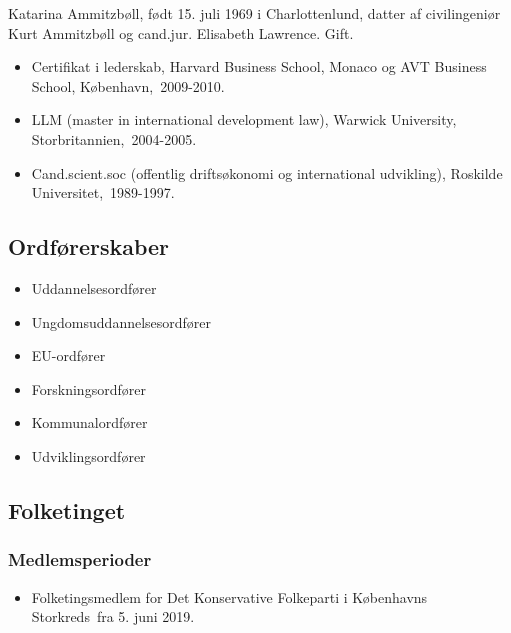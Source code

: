 \documentclass[11pt, a4paper]{awesome-cv}
\begin{document}
\makecvheader[R]
\makelettertitle
\begin{cvletter}
Katarina Ammitzbøll, født 15. juli 1969 i Charlottenlund, datter af civilingeniør Kurt Ammitzbøll og cand.jur. Elisabeth Lawrence. Gift.

\begin{itemize}
\item Certifikat i lederskab, Harvard Business School, Monaco og AVT Business School, København, 2009-2010.
\item LLM (master in  international development law), Warwick University, Storbritannien, 2004-2005.
\item Cand.scient.soc (offentlig driftsøkonomi og international udvikling), Roskilde Universitet, 1989-1997.
\end{itemize}
\subsection*{Ordførerskaber}
\begin{itemize}
\item Uddannelsesordfører
\item Ungdomsuddannelsesordfører
\item EU-ordfører
\item Forskningsordfører
\item Kommunalordfører
\item Udviklingsordfører
\end{itemize}
\subsection*{Folketinget}
\subsubsection*{Medlemsperioder}
\begin{itemize}
\item Folketingsmedlem for Det Konservative Folkeparti i Københavns Storkreds fra 5. juni 2019.
\end{itemize}

\end{cvletter}
\end{document}
